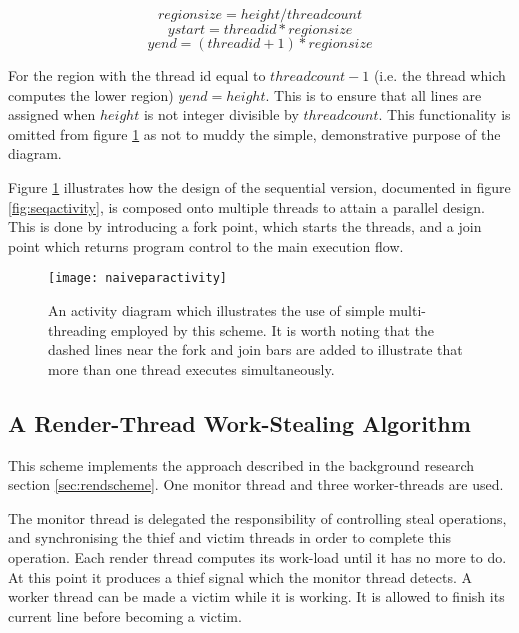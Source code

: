 \[regionsize = height / threadcount\]
\[ystart = threadid * regionsize\]
\[yend = (threadid + 1) * regionsize\]

For the region with the thread id equal to \(threadcount - 1\) (i.e. the thread which computes the lower region) 
\(yend = height\). This is to ensure that all lines are assigned when \(height\) is not integer divisible by \(threadcount\).
This functionality is omitted from figure \ref{fig:naiveparactivity} as not to muddy the simple, demonstrative purpose of the diagram.

Figure \ref{fig:naiveparactivity} illustrates how the design of the sequential version, documented in 
figure \ref{fig:seqactivity}, is composed onto multiple threads to attain a parallel design.
This is done by introducing a fork point, which starts the threads, and a join point which 
returns program control to the main execution flow.

\begin{figure}[H]
\centering
\texttt{[image: naiveparactivity]}
\caption{
    An activity diagram which illustrates the use of simple multi-threading employed by this 
    scheme. It is worth noting that the dashed lines near the fork and join bars 
    are added to illustrate that more than one thread executes simultaneously.
}
\label{fig:naiveparactivity}
\end{figure}

\subsection*{A Render-Thread Work-Stealing Algorithm}

This scheme implements the approach described in the background research section \ref{sec:rendscheme}. 
One monitor thread and three worker-threads are used. 

The monitor thread is delegated the responsibility 
of controlling steal operations, and synchronising the thief and victim threads in order to complete
this operation.
Each render thread computes its work-load until it has no more to do. At this point it produces a thief
signal which the monitor thread detects. 
A worker thread can be made a victim while it is working. It is allowed to finish its current line 
before becoming a victim.

